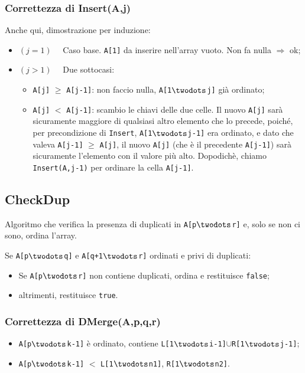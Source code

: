 \subsubsection{Correttezza di Insert(A,j)}
Anche qui, dimostrazione per induzione:
\begin{itemize}
	\item[] $(j = 1) \quad$ Caso base. \texttt{A[1]} da inserire nell'array vuoto. Non fa nulla
	$\Rightarrow$ ok;
	\item[] $(j > 1) \quad$ Due sottocasi:
	\begin{itemize}
		\item \texttt{A[j]} $\geq$ \texttt{A[j-1]}: non faccio nulla, \texttt{A[1$\twodots$j]} già
		ordinato;
		\item \texttt{A[j]} $<$ \texttt{A[j-1]}: scambio le chiavi delle due celle. Il nuovo \texttt{A[j]}
		sarà sicuramente maggiore di qualsiasi altro elemento che lo precede, poiché, per precondizione di 
		\texttt{Insert}, \texttt{A[1$\twodots$j-1]} era ordinato, e dato che valeva \texttt{A[j-1]} $\geq$ 
		\texttt{A[j]}, il nuovo \texttt{A[j]} (che è il precedente \texttt{A[j-1]}) sarà sicuramente l'elemento con il valore più alto. 
		Dopodichè, chiamo \texttt{Insert(A,j-1)} per ordinare la cella \texttt{A[j-1]}.
 	\end{itemize}
\end{itemize}
 
\subsection{CheckDup}
Algoritmo che verifica la presenza di duplicati in \texttt{A[p$\twodots$r]} e, 
solo se non ci sono, ordina l'array.

Se \texttt{A[p$\twodots$q]} e \texttt{A[q+1$\twodots$r]} ordinati e privi di duplicati:
\begin{itemize}[noitemsep]
	\item Se \texttt{A[p$\twodots$r]} non contiene duplicati, ordina e restituisce \texttt{false};
	\item altrimenti, restituisce \texttt{true}.
\end{itemize}





\subsubsection{Correttezza di DMerge(A,p,q,r)}
\begin{itemize}
	\item \texttt{A[p$\twodots$k-1]} è ordinato, contiene \texttt{L[1$\twodots$i-1]}$\cup$\texttt{R[1$\twodots$j-1]};
	\item \texttt{A[p$\twodots$k-1]} $<$ \texttt{L[1$\twodots$n1]}, \texttt{R[1$\twodots$n2]}.
\end{itemize}